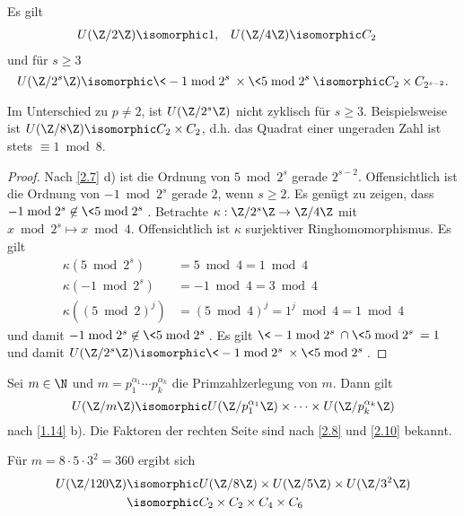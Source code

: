 \begin{st} \label{2.10}
	Es gilt
	\begin{align*}
		U(\Z / 2 \Z) &\isomorphic 1, &
		U(\Z / 4 \Z) &\isomorphic C_2
	\end{align*}
	und für $s \ge 3$
	\[
		U(\Z / 2^s \Z)
		\isomorphic \< - 1 \bmod 2^s \> \times \< 5 \bmod 2^s \>
		\isomorphic C_2 \times C_{2^{s-2}}.
	\]
	\begin{note}
		Im Unterschied zu $p \neq 2$, ist $U(\Z / 2^s \Z)$ nicht zyklisch für $s \ge 3$.
		Beispielsweise ist $U(\Z / 8 \Z) \isomorphic C_2 \times C_2$, d.h. das Quadrat einer ungeraden Zahl ist stets $\equiv 1 \bmod 8$.
	\end{note}
	\begin{proof}
		Nach \ref{2.7} d) ist die Ordnung von $5 \bmod 2^s$ gerade $2^{s-2}$.
		Offensichtlich ist die Ordnung von $-1 \bmod 2^s$ gerade $2$, wenn $s \ge 2$.
		Es genügt zu zeigen, dass $-1 \bmod 2^s \not\in \< 5 \bmod 2^s \>$.
		Betrachte $\kappa: \Z / 2^s \Z \to \Z / 4 \Z$ mit $x \bmod 2^s \mapsto x \bmod 4$.
		Offensichtlich ist $\kappa$ surjektiver Ringhomomorphismus.
		Es gilt
		\begin{align*}
			\kappa(5 \bmod 2^s) &= 5 \bmod 4 = 1 \bmod 4 \\
			\kappa(-1 \bmod 2^s) &= -1 \bmod 4 = 3 \bmod 4 \\
			\kappa((5 \bmod 2)^j) &= (5 \bmod 4)^j = 1^j \bmod 4 = 1 \bmod 4
		\end{align*}
		und damit $-1 \bmod 2^s \not\in \< 5 \bmod 2^s\>$.
		Es gilt $\<-1 \bmod 2^s\> \cap \< 5 \bmod 2^s\> = 1$ und damit $U(\Z / 2^s \Z) \isomorphic \<-1 \bmod 2^s \> \times \< 5 \bmod 2^s \>$.
	\end{proof}
\end{st}

\begin{kor} \label{2.11}
	Sei $m \in \N$ und $m = p_1^{\alpha_1} \dotsb p_k^{\alpha_k}$ die Primzahlzerlegung von $m$.
	Dann gilt
	\[
		U(\Z / m\Z) \isomorphic U(\Z / p_1^{\alpha_1}\Z) \times \dotsb \times U(\Z / p_k^{\alpha_k} \Z)
	\]
	nach \ref{1.14} b).
	Die Faktoren der rechten Seite sind nach \ref{2.8} und \ref{2.10} bekannt.
\end{kor}

\begin{ex*}
	Für $m = 8 \cdot 5 \cdot 3^2 = 360$ ergibt sich
	\begin{align*}
		U(\Z / 120 \Z)
		&\isomorphic U(\Z / 8 \Z) \times U(\Z / 5 \Z) \times U(\Z / 3^2 \Z) \\
		&\isomorphic C_2 \times C_2 \times C_4 \times C_6
	\end{align*}
\end{ex*}

